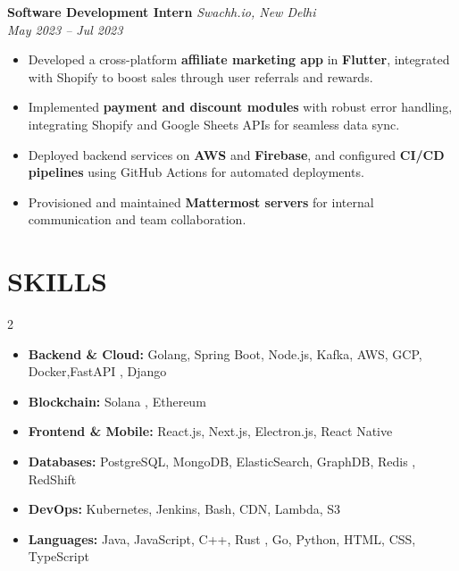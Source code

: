 \documentclass[a4paper,10pt]{article}
\begin{document}
\textbf{Software Development Intern} \hfill \textit{Swachh.io, New Delhi} \\
\textit{May 2023 – Jul 2023}
\begin{itemize}
  \item Developed a cross-platform \textbf{affiliate marketing app} in \textbf{Flutter}, integrated with Shopify to boost sales through user referrals and rewards.
  \item Implemented \textbf{payment and discount modules} with robust error handling, integrating Shopify and Google Sheets APIs for seamless data sync.
  \item Deployed backend services on \textbf{AWS} and \textbf{Firebase}, and configured \textbf{CI/CD pipelines} using GitHub Actions for automated deployments.
  \item Provisioned and maintained \textbf{Mattermost servers} for internal communication and team collaboration.
\end{itemize}

\section*{SKILLS}
\begin{multicols}{2}
\raggedright
\begin{itemize}[leftmargin=1.2em, itemsep=4pt]  %
    \item \textbf{Backend \& Cloud:} Golang, Spring Boot, Node.js, Kafka, AWS, GCP, Docker,FastAPI , Django
    \item \textbf{Blockchain:} Solana , Ethereum 
    \item \textbf{Frontend \& Mobile:} React.js, Next.js, Electron.js, React Native
    \item \textbf{Databases:} PostgreSQL, MongoDB, ElasticSearch, GraphDB, Redis , RedShift
    \item \textbf{DevOps:} Kubernetes, Jenkins, Bash, CDN, Lambda, S3
    \item \textbf{Languages:} Java, JavaScript, C++, Rust , Go, Python, HTML, CSS, TypeScript
\end{itemize}
\end{multicols}
\end{document}
